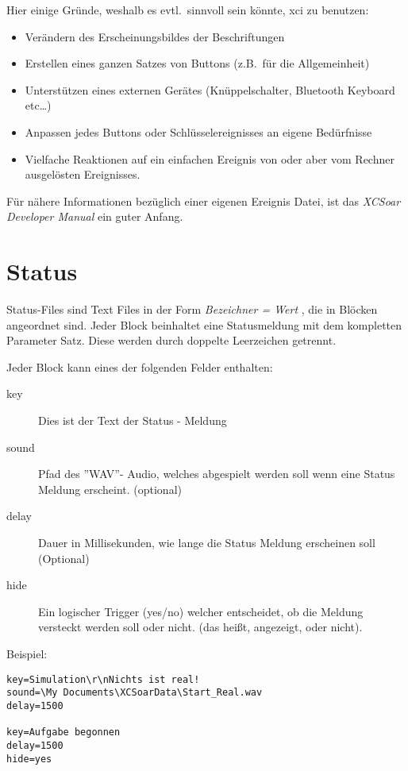 Hier einige Gründe, weshalb es evtl.\ sinnvoll sein könnte, \textsf{xci} zu benutzen:
\begin{itemize}
\item Verändern des Erscheinungsbildes der   Beschriftungen
\item Erstellen eines ganzen Satzes von Buttons (z.B.\ für die Allgemeinheit)
\item Unterstützen eines externen Gerätes (Knüppelschalter, Bluetooth Keyboard etc\dots)
\item Anpassen jedes Buttons oder Schlüsselereignisses an eigene Bedürfnisse
\item Vielfache Reaktionen auf ein einfachen Ereignis von  \xc oder aber vom Rechner
ausgelösten Ereignisses.
\end{itemize}
Für nähere Informationen bezüglich einer eigenen Ereignis Datei, ist das 
{\em XCSoar Developer Manual} ein guter Anfang.


\section{Status}\label{sec:status}
Status-Files sind Text Files in der Form  {\em Bezeichner  = Wert },
die in Blöcken  angeordnet sind. Jeder Block beinhaltet eine Statusmeldung
mit dem kompletten Parameter Satz.
Diese werden durch doppelte Leerzeichen getrennt.

Jeder Block kann eines der folgenden Felder enthalten:

\begin{description}
\item[key]  Dies ist der Text der Status - Meldung
\item[sound]  Pfad des ''\textsf{WAV}''- Audio, welches abgespielt werden soll
wenn eine Status Meldung erscheint. (optional)
\item[delay] Dauer in Millisekunden, wie lange die Status Meldung erscheinen soll (Optional)
\item[hide] Ein logischer Trigger (yes/no) welcher entscheidet, ob die Meldung
versteckt werden soll oder nicht. (das heißt, angezeigt, oder nicht).
\end{description}

Beispiel:
\begin{verbatim}
key=Simulation\r\nNichts ist real!
sound=\My Documents\XCSoarData\Start_Real.wav
delay=1500

key=Aufgabe begonnen
delay=1500
hide=yes
\end{verbatim}


